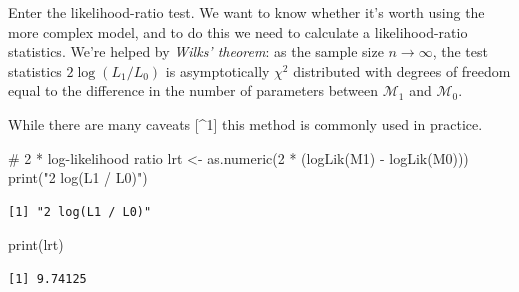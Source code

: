 \documentclass[
  letterpaper,
  DIV=11,
  numbers=noendperiod]{scrreprt}
\newenvironment{Shaded}{\begin{snugshade}}{\end{snugshade}}
\newcommand{\CommentTok}[1]{\textcolor[rgb]{0.37,0.37,0.37}{#1}}
\newcommand{\DecValTok}[1]{\textcolor[rgb]{0.68,0.00,0.00}{#1}}
\newcommand{\FunctionTok}[1]{\textcolor[rgb]{0.28,0.35,0.67}{#1}}
\newcommand{\NormalTok}[1]{\textcolor[rgb]{0.00,0.23,0.31}{#1}}
\newcommand{\OtherTok}[1]{\textcolor[rgb]{0.00,0.23,0.31}{#1}}
\newcommand{\SpecialCharTok}[1]{\textcolor[rgb]{0.37,0.37,0.37}{#1}}
\newcommand{\StringTok}[1]{\textcolor[rgb]{0.13,0.47,0.30}{#1}}
\begin{document}
Enter the likelihood-ratio test. We want to know whether it's worth
using the more complex model, and to do this we need to calculate a
likelihood-ratio statistics. We're helped by \emph{Wilks' theorem}: as
the sample size \(n \to \infty\), the test statistics
\(2 \log(L_1 / L_0)\) is asymptotically \(\chi^2\) distributed with
degrees of freedom equal to the difference in the number of parameters
between \(\mathcal M_1\) and \(\mathcal M_0\).

While there are many caveats {[}\^{}1{]} this method is commonly used in
practice.

\begin{Shaded}
\begin{Highlighting}[]
\CommentTok{\# 2 * log{-}likelihood ratio}
\NormalTok{lrt }\OtherTok{\textless{}{-}} \FunctionTok{as.numeric}\NormalTok{(}\DecValTok{2} \SpecialCharTok{*}\NormalTok{ (}\FunctionTok{logLik}\NormalTok{(M1) }\SpecialCharTok{{-}} \FunctionTok{logLik}\NormalTok{(M0)))}
\FunctionTok{print}\NormalTok{(}\StringTok{"2 log(L1 / L0)"}\NormalTok{)}
\end{Highlighting}
\end{Shaded}

\begin{verbatim}
[1] "2 log(L1 / L0)"
\end{verbatim}

\begin{Shaded}
\begin{Highlighting}[]
\FunctionTok{print}\NormalTok{(lrt)}
\end{Highlighting}
\end{Shaded}

\begin{verbatim}
[1] 9.74125
\end{verbatim}

\begin{Shaded}
\end{Shaded}
\end{document}
